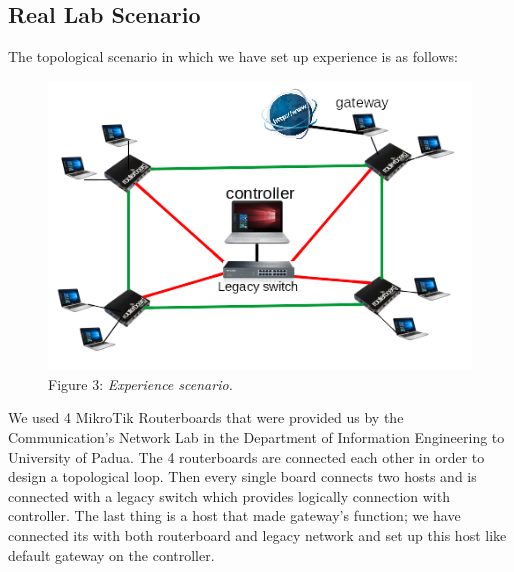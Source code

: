 \documentclass[article,10pt]{IEEEtran}
\begin{document}
\subsection{Real Lab Scenario}
The topological scenario in which we have set up experience is as follows:
\begin{figure}[!h]
 \centering
 \includegraphics[scale=0.70]{images/topo.png}
 {Figure 3: \emph{Experience scenario.}}
 \label{fig:topo}
\end{figure}

We used 4 MikroTik Routerboards that were provided us by the Communication's Network Lab in the Department of Information Engineering to 
University of Padua.
The 4 routerboards are connected each other in order to design a topological loop. Then every single board connects two hosts and is connected with a 
legacy switch which provides logically connection with controller.
The last thing is a host that made gateway's function; we have connected its with both routerboard and legacy network and set up this host like default 
gateway on the controller.
\end{document}

